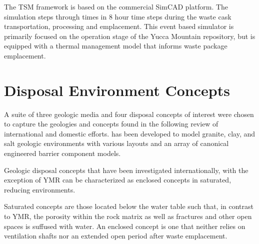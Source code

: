 The TSM framework is based on the commercial SimCAD platform. The simulation 
steps through times in 8 hour time steps during the waste cask transportation, 
processing and emplacement. This event based simulator is primarily focused on 
the operation stage of the Yucca Mountain repository, but is equipped with a 
thermal management model that informs waste package emplacement.

\section{Disposal Environment Concepts}





A suite of three geologic media and four disposal concepts of interest were 
chosen to capture the geologies and concepts found in the following review of 
international and domestic efforts. \Cyder has been developed to model granite, 
clay, and salt geologic environments with various layouts and an array of 
canonical engineered barrier component models.  

Geologic disposal concepts that have been investigated internationally, with the 
exception of \gls{YMR} can be characterized as enclosed concepts in saturated, 
reducing environments. 

Saturated concepts are those located below the water table such that, in contrast to 
\gls{YMR}, the porosity within the rock matrix as well as fractures 
and other open spaces is suffused with water. An enclosed concept is one that 
neither relies on ventilation shafts nor an extended open period after waste 
emplacement.

